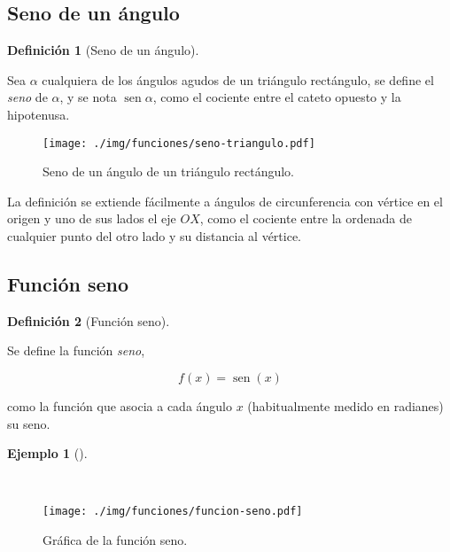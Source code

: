 \documentclass[
  a4paper,
]{scrreport}
\theoremstyle{definition}
\theoremstyle{definition}
\newtheorem{example}{Ejemplo}[chapter]
\theoremstyle{definition}
\newtheorem{definition}{Definición}[chapter]
\theoremstyle{plain}
\theoremstyle{plain}
\theoremstyle{plain}
\theoremstyle{remark}
\begin{document}
\subsection{Seno de un ángulo}\label{seno-de-un-uxe1ngulo}

\begin{definition}[Seno de un
ángulo]\protect\hypertarget{def-seno-angulo}{}\label{def-seno-angulo}

Sea \(\alpha\) cualquiera de los ángulos agudos de un triángulo
rectángulo, se define el \emph{seno} de \(\alpha\), y se nota
\(\operatorname{sen} \alpha\), como el cociente entre el cateto opuesto
y la hipotenusa.

\end{definition}

\begin{figure}[H]

{\centering \texttt{[image: ./img/funciones/seno-triangulo.pdf]}

}

\caption{Seno de un ángulo de un triángulo rectángulo.}

\end{figure}%

La definición se extiende fácilmente a ángulos de circunferencia con
vértice en el origen y uno de sus lados el eje \(OX\), como el cociente
entre la ordenada de cualquier punto del otro lado y su distancia al
vértice.

\subsection{Función seno}\label{funciuxf3n-seno}

\begin{definition}[Función
seno]\protect\hypertarget{def-funcion-seno}{}\label{def-funcion-seno}

Se define la función \emph{seno},

\[f(x)=\operatorname{sen}(x)\]

como la función que asocia a cada ángulo \(x\) (habitualmente medido en
radianes) su seno.

\end{definition}

\begin{example}[]\protect\hypertarget{exm-funcion-seno}{}\label{exm-funcion-seno}

~

\begin{figure}[H]

{\centering \texttt{[image: ./img/funciones/funcion-seno.pdf]}

}

\caption{Gráfica de la función seno.}

\end{figure}%

\end{example}
\end{document}
